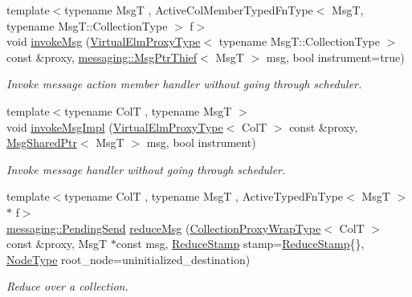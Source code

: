 \begin{DoxyCompactItemize}
{\footnotesize template$<$typename MsgT , Active\+Col\+Member\+Typed\+Fn\+Type$<$ Msg\+T, typename Msg\+T\+::\+Collection\+Type $>$ f$>$ }\\void \hyperlink{structvt_1_1vrt_1_1collection_1_1_collection_manager_accc84ffa2eb3851892143aad927dd799}{invoke\+Msg} (\hyperlink{namespacevt_1_1vrt_a620a5c8c59d13e513f690c74b4af516f}{Virtual\+Elm\+Proxy\+Type}$<$ typename Msg\+T\+::\+Collection\+Type $>$ const \&proxy, \hyperlink{structvt_1_1messaging_1_1_msg_ptr_thief}{messaging\+::\+Msg\+Ptr\+Thief}$<$ MsgT $>$ msg, bool instrument=true)
\begin{DoxyCompactList}\small\item\em Invoke message action member handler without going through scheduler. \end{DoxyCompactList}\item 
{\footnotesize template$<$typename ColT , typename MsgT $>$ }\\void \hyperlink{structvt_1_1vrt_1_1collection_1_1_collection_manager_abaf663e12552109d1af87d8c9a82ce25}{invoke\+Msg\+Impl} (\hyperlink{namespacevt_1_1vrt_a620a5c8c59d13e513f690c74b4af516f}{Virtual\+Elm\+Proxy\+Type}$<$ ColT $>$ const \&proxy, \hyperlink{namespacevt_ab2b3d506ec8e8d1540aede826d84a239}{Msg\+Shared\+Ptr}$<$ MsgT $>$ msg, bool instrument)
\begin{DoxyCompactList}\small\item\em Invoke message handler without going through scheduler. \end{DoxyCompactList}\item 
{\footnotesize template$<$typename ColT , typename MsgT , Active\+Typed\+Fn\+Type$<$ Msg\+T $>$ $\ast$ f$>$ }\\\hyperlink{structvt_1_1messaging_1_1_pending_send}{messaging\+::\+Pending\+Send} \hyperlink{structvt_1_1vrt_1_1collection_1_1_collection_manager_a2ac056928e39edf125420e1113cde2bf}{reduce\+Msg} (\hyperlink{structvt_1_1vrt_1_1collection_1_1_collection_manager_a56458ed7f9bb22b631b9b3a745f42f94}{Collection\+Proxy\+Wrap\+Type}$<$ ColT $>$ const \&proxy, MsgT $\ast$const msg, \hyperlink{structvt_1_1vrt_1_1collection_1_1_collection_manager_ae8aac19e0ae07e9225142e5880eac830}{Reduce\+Stamp} stamp=\hyperlink{structvt_1_1vrt_1_1collection_1_1_collection_manager_ae8aac19e0ae07e9225142e5880eac830}{Reduce\+Stamp}\{\}, \hyperlink{namespacevt_a866da9d0efc19c0a1ce79e9e492f47e2}{Node\+Type} root\+\_\+node=uninitialized\+\_\+destination)
\begin{DoxyCompactList}\small\item\em Reduce over a collection. \end{DoxyCompactList}\item 

\end{DoxyCompactItemize}
